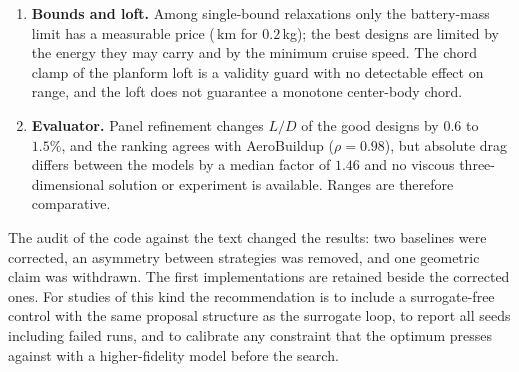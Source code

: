 \begin{enumerate}
    \item \textbf{Bounds and loft.} Among single-bound relaxations only the battery-mass limit has a measurable price (\NbpBmassGain\,km for $0.2$\,kg); the best designs are limited by the energy they may carry and by the minimum cruise speed. The chord clamp of the planform loft is a validity guard with no detectable effect on range, and the loft does not guarantee a monotone center-body chord.
    \item \textbf{Evaluator.} Panel refinement changes $L/D$ of the good designs by $0.6$ to $1.5\%$, and the ranking agrees with AeroBuildup ($\rho = 0.98$), but absolute drag differs between the models by a median factor of $1.46$ and no viscous three-dimensional solution or experiment is available. Ranges are therefore comparative.
\end{enumerate}

The audit of the code against the text changed the results: two baselines were corrected, an asymmetry between strategies was removed, and one geometric claim was withdrawn. The first implementations are retained beside the corrected ones. For studies of this kind the recommendation is to include a surrogate-free control with the same proposal structure as the surrogate loop, to report all seeds including failed runs, and to calibrate any constraint that the optimum presses against with a higher-fidelity model before the search.
